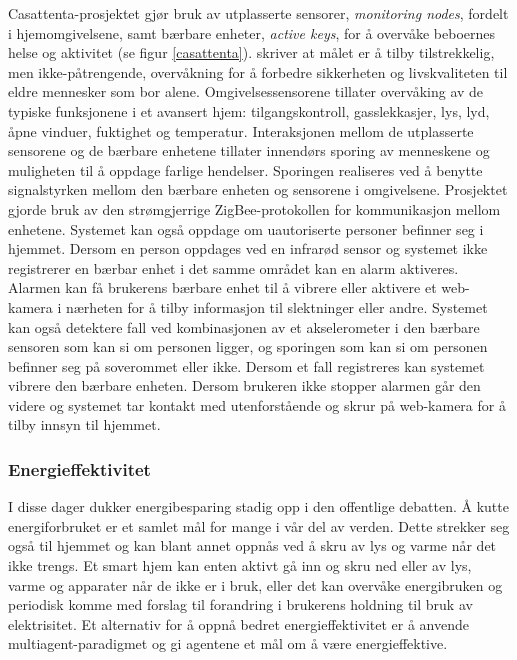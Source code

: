 Casattenta-prosjektet gjør bruk av utplasserte sensorer, \emph{monitoring nodes}, fordelt i hjemomgivelsene, samt bærbare enheter, \emph{active keys}, for å overvåke beboernes helse og aktivitet (se figur \ref{casattenta}). \citet{casattenta} skriver at målet er å tilby tilstrekkelig, men ikke-påtrengende, overvåkning for å forbedre sikkerheten og livskvaliteten til eldre mennesker som bor alene. Omgivelsessensorene tillater overvåking av de typiske funksjonene i et avansert hjem: tilgangskontroll, gasslekkasjer, lys, lyd, åpne vinduer, fuktighet og temperatur. Interaksjonen mellom de utplasserte sensorene og de bærbare enhetene tillater innendørs sporing av menneskene og muligheten til å oppdage farlige hendelser. Sporingen realiseres ved å benytte signalstyrken mellom den bærbare enheten og sensorene i omgivelsene. Prosjektet gjorde bruk av den strømgjerrige ZigBee-protokollen for kommunikasjon mellom enhetene. Systemet kan også oppdage om uautoriserte personer befinner seg i hjemmet. Dersom en person oppdages ved en infrarød sensor og systemet ikke registrerer en bærbar enhet i det samme området kan en alarm aktiveres. Alarmen kan få brukerens bærbare enhet til å vibrere eller aktivere et web-kamera i nærheten for å tilby informasjon til slektninger eller andre. Systemet kan også detektere fall ved kombinasjonen av et akselerometer i den bærbare sensoren som kan si om personen ligger, og sporingen som kan si om personen befinner seg på soverommet eller ikke. Dersom et fall registreres kan systemet vibrere den bærbare enheten. Dersom brukeren ikke stopper alarmen går den videre og systemet tar kontakt med utenforstående og skrur på web-kamera for å tilby innsyn til hjemmet.

\subsubsection*{Energieffektivitet}
I disse dager dukker energibesparing stadig opp i den offentlige debatten. Å kutte energiforbruket er et samlet mål for mange i vår del av verden. Dette strekker seg også til hjemmet og kan blant annet oppnås ved å skru av lys og varme når det ikke trengs. Et smart hjem kan enten aktivt gå inn og skru ned eller av lys, varme og apparater når de ikke er i bruk, eller det kan overvåke energibruken og periodisk komme med forslag til forandring i brukerens holdning til bruk av elektrisitet. Et alternativ for å oppnå bedret energieffektivitet er å anvende multiagent-paradigmet og gi agentene et mål om å være energieffektive.

